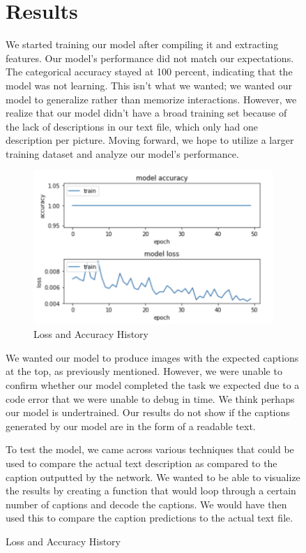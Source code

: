 \documentclass[conference]{IEEEtran}
\begin{document}
\begin{figure}[htbp]
\section{Results}
We started training our model after compiling it and extracting features. Our model's performance did not match our expectations. The categorical accuracy stayed at 100 percent, indicating that the model was not learning. This isn't what we wanted; we wanted our model to generalize rather than memorize interactions. However, we realize that our model didn't have a broad training set because of the lack of descriptions in our text file, which only had one description per picture. Moving forward, we hope to utilize a larger training dataset and analyze our model’s performance. 

\begin{figure}[htbp]
\centerline{\includegraphics[width=\linewidth]{modelaccuracy.png}}
\caption{Loss and Accuracy History}
\label{fig10}
\end{figure}

We wanted our model to produce images with the expected captions at the top, as previously mentioned. However, we were unable to confirm whether our model completed the task we expected due to a code error that we were unable to debug in time. We think perhaps our model is undertrained. Our results do not show if the captions generated by our model are in the form of a readable text. 

To test the model, we came across various techniques that could be used to compare the actual text description as compared to the caption outputted by the network. We wanted to be able to visualize the results by creating a function that would loop through a certain number of captions and decode the captions. We would have then used this to compare the caption predictions to the actual text file. 


\end{figure}
\end{document}
